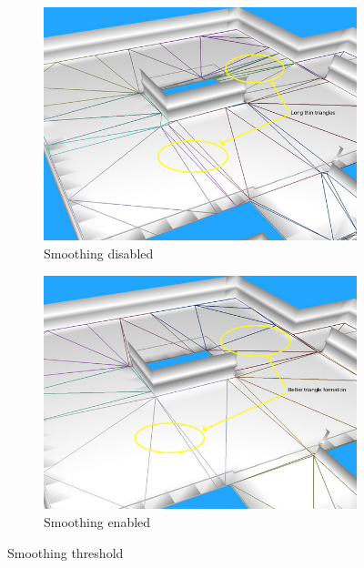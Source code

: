 \documentclass[a4paper,11pt]{article}
\begin{document}
\begin{itemize}
\begin{figure}[H]
        \centering
        \begin{subfigure}[b]{0.48\textwidth}
                \centering
                \includegraphics[width=\textwidth]{smoothing_0.png}
                \caption{Smoothing disabled}
        \end{subfigure}
        \begin{subfigure}[b]{0.48\textwidth}
                \centering
                \includegraphics[width=\textwidth]{smoothing_1.png}
                \caption{Smoothing enabled}
        \end{subfigure}
        \caption{Smoothing threshold}
	\end{figure}        


\end{itemize}
\end{document}
